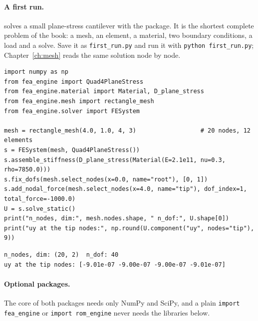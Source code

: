 \paragraph{A first run.}  solves a small plane-stress cantilever with the package. It is the shortest complete problem of the book: a mesh, an element, a material, two boundary conditions, a load and a solve. Save it as \texttt{first\_run.py} and run it with \texttt{python first\_run.py}; Chapter~\ref{ch:mesh} reads the same solution node by node.
\begin{lstlisting}[caption={A first complete problem: a plane-stress cantilever loaded at its tip.},label={lst:gs-first}]
import numpy as np
from fea_engine import Quad4PlaneStress
from fea_engine.material import Material, D_plane_stress
from fea_engine.mesh import rectangle_mesh
from fea_engine.solver import FESystem

mesh = rectangle_mesh(4.0, 1.0, 4, 3)                  # 20 nodes, 12 elements
s = FESystem(mesh, Quad4PlaneStress())
s.assemble_stiffness(D_plane_stress(Material(E=2.1e11, nu=0.3, rho=7850.0)))
s.fix_dofs(mesh.select_nodes(x=0.0, name="root"), [0, 1])
s.add_nodal_force(mesh.select_nodes(x=4.0, name="tip"), dof_index=1, total_force=-1000.0)
U = s.solve_static()
print("n_nodes, dim:", mesh.nodes.shape, " n_dof:", U.shape[0])
print("uy at the tip nodes:", np.round(U.component("uy", nodes="tip"), 9))
\end{lstlisting}
\begin{lstlisting}[numbers=none,language={},keywordstyle={},commentstyle={},frame=single,aboveskip=2pt]
n_nodes, dim: (20, 2)  n_dof: 40
uy at the tip nodes: [-9.01e-07 -9.00e-07 -9.00e-07 -9.01e-07]
\end{lstlisting}

\paragraph{Optional packages.} The core of both packages needs only NumPy and SciPy, and a plain \texttt{import fea\_engine} or \texttt{import rom\_engine} never needs the libraries below.

